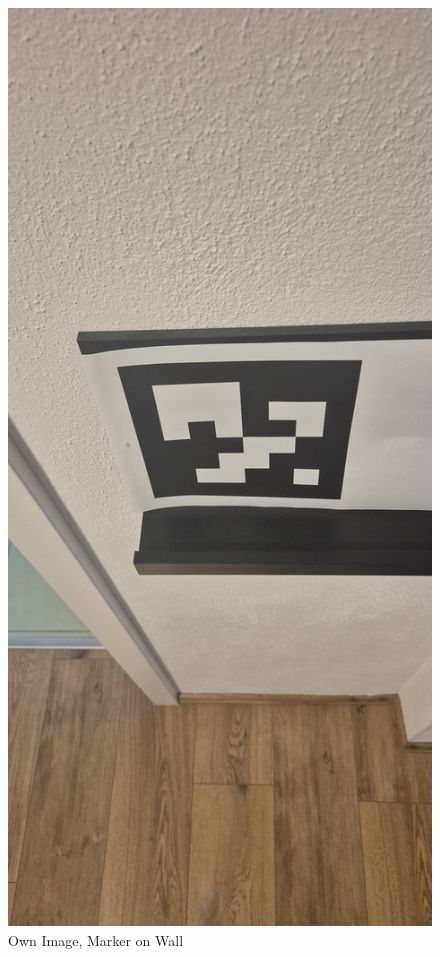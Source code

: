 \documentclass[a4paper,twocolumn]{article}
\begin{document}
\begin{figure}[htbp]
    \centering
    \includegraphics[width=\textwidth, keepaspectratio]{newImg/20241129_153147.jpg}
    \caption{Own Image, Marker on Wall \cite{tim-schweitzer}}
    \label{fig:example-pappendix3}
\end{figure}
\end{document}
